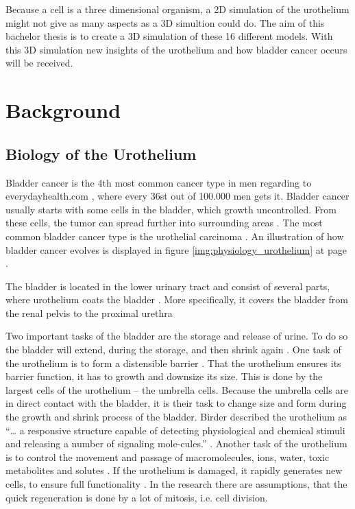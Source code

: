 Because a cell is a three dimensional organism, a 2D simulation of the urothelium might not give as many aspects as a 3D simultion could do. The aim of this bachelor thesis is to create a 3D simulation of these 16 different models. With this 3D simulation new insights of the urothelium and how bladder cancer occurs will be received. 

\section{Background}
\subsection{Biology of the Urothelium}
Bladder cancer is the 4th most common cancer type in men regarding to everydayhealth.com \cite{EveryDayHealth.com}, where every 36st out of 100.000 men gets it. Bladder cancer usually starts with some cells in the bladder, which growth uncontrolled. From these cells, the tumor can spread further into surrounding areas \cite{Cancer.org}. The most common bladder cancer type is the urothelial carcinoma \cite{Cancer.org}. An illustration of how bladder cancer evolves is displayed in figure \ref{img:physiology_urothelium} at page \pageref{img:physiology_urothelium}.

The bladder is located in the lower urinary tract and consist of several parts, where urothelium coats the bladder \cite{Lazzeri2006}. More specifically, it covers the bladder from the renal pelvis to the proximal urethra \cite{Yamany2014, Birder2005} 

Two important tasks of the bladder are the storage and release of urine. To do so the bladder will extend, during the storage, and then shrink again \cite{Karl-ErikAndersson2004}. One task of the urothelium is to form a distensible barrier \cite{Apodaca2004, Lazzeri2006, PuneetKhandelwal2009, WRCross2005}. That the urothelium ensures its barrier function, it has to growth and downsize its size. This is done by the largest cells of the urothelium – the umbrella cells. Because the umbrella cells are in direct contact with the bladder, it is their task to change size and form during the growth and shrink process of the bladder. Birder described the urothelium as “… a responsive structure capable of detecting physiological and chemical stimuli and releasing a number of signaling mole-cules.” \cite{Birder2005}. Another task of the urothelium is to control the movement and passage of macromolecules, ions, water, toxic metabolites and solutes \cite{Apodaca2004, PuneetKhandelwal2009}. If the urothelium is damaged, it rapidly generates new cells, to ensure full functionality \cite{Apodaca2004, Yamany2014, PuneetKhandelwal2009}. In the research there are assumptions, that the quick regeneration is done by a lot of mitosis, i.e. cell division.

